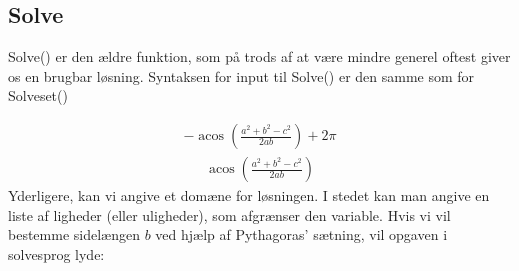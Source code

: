 \documentclass[letterpaper,10pt,english]{jupyterBook}
\begin{document}
\subsection{Solve}
\label{\detokenize{notebooks/sympy/Notebook3_ligninger:solve}}
Solve() er den ældre funktion, som på trods af at være mindre generel oftest giver os en brugbar løsning. Syntaksen for input til Solve() er den samme som for Solveset()

\begin{sphinxVerbatim}[commandchars=\\\{\}]
 
\end{sphinxVerbatim}

\begin{sphinxVerbatim}
\end{sphinxVerbatim}


\begin{sphinxVerbatim}[commandchars=\\\{\}]
   
   
\end{sphinxVerbatim}
\begin{equation*}
\begin{split}\displaystyle - \operatorname{acos}{\left(\frac{a^{2} + b^{2} - c^{2}}{2 a b} \right)} + 2 \pi\end{split}
\end{equation*}\begin{equation*}
\begin{split}\displaystyle \operatorname{acos}{\left(\frac{a^{2} + b^{2} - c^{2}}{2 a b} \right)}\end{split}
\end{equation*}
Yderligere, kan vi angive et domæne for løsningen. I stedet kan man angive en liste af ligheder (eller uligheder), som afgrænser den variable. Hvis vi vil bestemme sidelængen \(b\) ved hjælp af Pythagoras’ sætning, vil opgaven i solve\sphinxhyphen{}sprog lyde:
\end{document}
